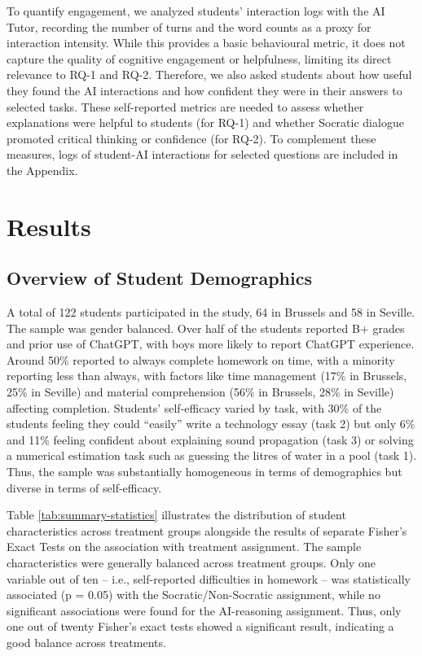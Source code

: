 \documentclass[
  11pt,
]{article}
\begin{document}
To quantify engagement, we analyzed students' interaction logs with the AI Tutor, recording the number of turns and the word counts as a proxy for interaction intensity. While this provides a basic behavioural metric, it does not capture the quality of cognitive engagement or helpfulness, limiting its direct relevance to RQ-1 and RQ-2. Therefore, we also asked students about how useful they found the AI interactions and how confident they were in their answers to selected tasks. These self-reported metrics are needed to assess whether explanations were helpful to students (for RQ-1) and whether Socratic dialogue promoted critical thinking or confidence (for RQ-2). To complement these measures, logs of student-AI interactions for selected questions are included in the Appendix.

\section{Results}\label{sec:results}

\subsection{Overview of Student Demographics}\label{overview-of-student-demographics}

A total of 122 students participated in the study, 64 in Brussels and 58 in Seville. The sample was gender balanced. Over half of the students reported B+ grades and prior use of ChatGPT, with boys more likely to report ChatGPT experience. Around 50\% reported to always complete homework on time, with a minority reporting less than always, with factors like time management (17\% in Brussels, 25\% in Seville) and material comprehension (56\% in Brussels, 28\% in Seville) affecting completion. Students' self-efficacy varied by task, with 30\% of the students feeling they could ``easily'' write a technology essay (task 2) but only 6\% and 11\% feeling confident about explaining sound propagation (task 3) or solving a numerical estimation task such as guessing the litres of water in a pool (task 1). Thus, the sample was substantially homogeneous in terms of demographics but diverse in terms of self-efficacy.

Table \ref{tab:summary-statistics} illustrates the distribution of student characteristics across treatment groups alongside the results of separate Fisher's Exact Tests on the association with treatment assignment. The sample characteristics were generally balanced across treatment groups. Only one variable out of ten -- i.e., self-reported difficulties in homework -- was statistically associated (p = 0.05) with the Socratic/Non-Socratic assignment, while no significant associations were found for the AI-reasoning assignment. Thus, only one out of twenty Fisher's exact tests showed a significant result, indicating a good balance across treatments.
\end{document}
